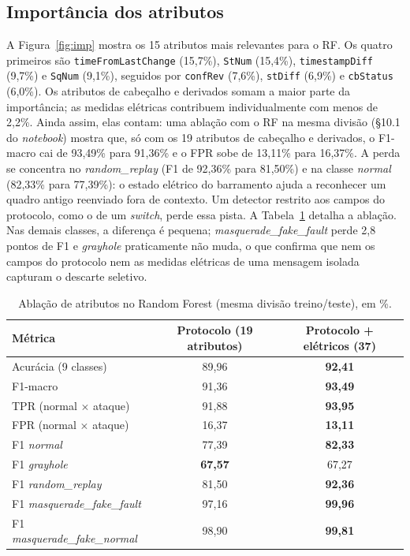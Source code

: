 \documentclass[12pt]{article}
\newcommand{\ataque}[1]{\textit{#1}}
\begin{document}
\subsection{Importância dos atributos}

A Figura~\ref{fig:imp} mostra os 15 atributos mais relevantes para o RF. Os
quatro primeiros são \texttt{timeFromLastChange} (15,7\%), \texttt{StNum}
(15,4\%), \texttt{timestampDiff} (9,7\%) e \texttt{SqNum} (9,1\%), seguidos
por \texttt{confRev} (7,6\%), \texttt{stDiff} (6,9\%) e \texttt{cbStatus}
(6,0\%). Os atributos de cabeçalho e derivados somam a maior parte da
importância; as medidas elétricas contribuem individualmente com menos de
2,2\%. Ainda assim, elas contam: uma ablação com o RF na mesma divisão (§10.1 do
\textit{notebook}) mostra que, só com os 19 atributos de cabeçalho e derivados,
o F1-macro cai de 93,49\% para 91,36\% e o FPR sobe de 13,11\% para 16,37\%. A
perda se concentra no \ataque{random\_replay} (F1 de 92,36\% para 81,50\%) e na
classe \textit{normal} (82,33\% para 77,39\%): o estado elétrico do barramento
ajuda a reconhecer um quadro antigo reenviado fora de contexto. Um detector
restrito aos campos do protocolo, como o de um \textit{switch}, perde essa pista.
A Tabela~\ref{tab:abl} detalha a ablação. Nas demais classes, a diferença é
pequena; \ataque{masquerade\_fake\_fault} perde 2,8 pontos de F1 e
\ataque{grayhole} praticamente não muda, o que confirma que nem os campos do
protocolo nem as medidas elétricas de uma mensagem isolada capturam o descarte
seletivo.

\begin{table}[!htbp]
\centering
\caption{Ablação de atributos no Random Forest (mesma divisão treino/teste), em \%.}
\label{tab:abl}
\small
\begin{tabular}{lcc}
\toprule
Métrica & Protocolo (19 atributos) & Protocolo + elétricos (37)\\
\midrule
Acurácia (9 classes)            & 89,96 & \textbf{92,41}\\
F1-macro                        & 91,36 & \textbf{93,49}\\
TPR (normal $\times$ ataque)    & 91,88 & \textbf{93,95}\\
FPR (normal $\times$ ataque)    & 16,37 & \textbf{13,11}\\
\midrule
F1 \textit{normal}                 & 77,39 & \textbf{82,33}\\
F1 \ataque{grayhole}               & \textbf{67,57} & 67,27\\
F1 \ataque{random\_replay}         & 81,50 & \textbf{92,36}\\
F1 \ataque{masquerade\_fake\_fault}& 97,16 & \textbf{99,96}\\
F1 \ataque{masquerade\_fake\_normal}& 98,90 & \textbf{99,81}\\
\bottomrule
\end{tabular}
\end{table}
\end{document}
